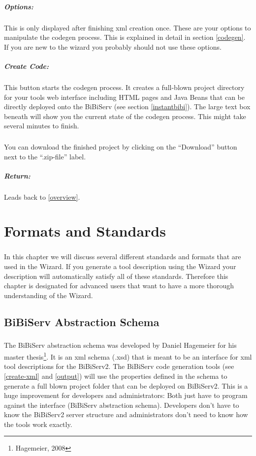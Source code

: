 \documentclass[a4paper,10pt]{book}
\begin{document}
\paragraph{Options:} This is only displayed after finishing xml creation once. These are your options to manipulate the codegen process. This is explained in detail in section \ref{codegen}. If you are new to the wizard you probably should not use these options.
\paragraph{Create Code:} This button starts the codegen process. It creates a full-blown project directory for your tools web interface including HTML pages and Java Beans that can be directly deployed onto the BiBiServ (see section \ref{instantbibi}). The large text box beneath will show you the current state of the codegen process. This might take several minutes to finish.
\paragraph{} You can download the finished project by clicking on the ``Download'' button next to the ``.zip-file'' label.
\paragraph{Return:} Leads back to \ref{overview}.

\chapter{Formats and Standards}
\label{standards}
\paragraph{} In this chapter we will discuss several different standards and formats that are used in the Wizard. If you generate a tool description using the Wizard your description will automatically satisfy all of these standards. Therefore this chapter is designated for advanced users that want to have a more thorough understanding of the Wizard.

\section{BiBiServ Abstraction Schema}
\label{bibiservabstraction}
\paragraph{} The BiBiServ abstraction schema was developed by Daniel Hagemeier for his master thesis\footnote{Hagemeier, 2008}.
It is an xml schema (.xsd) that is meant to be an interface for xml tool descriptions for the BiBiServ2. The BiBiServ code generation tools (see \ref{create-xml} and \ref{output}) will use the properties defined in the schema to generate a full blown project folder that can be deployed on BiBiServ2. This is a huge improvement for developers and administrators: Both just have to program against the interface (BiBiServ abstraction schema). Developers don't have to know the BiBiServ2 server structure and administrators don't need to know how the tools work exactly.
\end{document}
